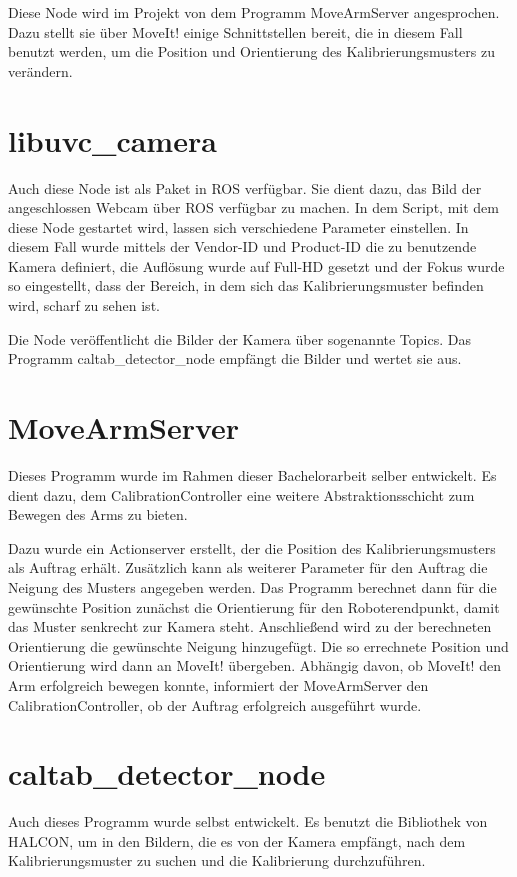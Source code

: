 Diese Node wird im Projekt von dem Programm MoveArmServer angesprochen. Dazu stellt sie über MoveIt! einige Schnittstellen bereit, die in diesem Fall benutzt werden, um die Position und Orientierung des Kalibrierungsmusters zu verändern.

\section{libuvc\_camera} %
\label{sec:libuvc_camera}
Auch diese Node ist als Paket in ROS verfügbar. Sie dient dazu, das Bild der angeschlossen Webcam über ROS verfügbar zu machen. In dem Script, mit dem diese Node gestartet wird, lassen sich verschiedene Parameter einstellen. In diesem Fall wurde mittels der Vendor-ID und Product-ID die zu benutzende Kamera definiert, die Auflösung wurde auf Full-HD gesetzt und der Fokus wurde so eingestellt, dass der Bereich, in dem sich das Kalibrierungsmuster befinden wird, scharf zu sehen ist.

Die Node veröffentlicht die Bilder der Kamera über sogenannte Topics. Das Programm caltab\_detector\_node empfängt die Bilder und wertet sie aus.

\section{MoveArmServer} %
\label{sec:movearmserver}
Dieses Programm wurde im Rahmen dieser Bachelorarbeit selber entwickelt. Es dient dazu, dem CalibrationController eine weitere Abstraktionsschicht zum Bewegen des Arms zu bieten.

Dazu wurde ein Actionserver erstellt, der die Position des Kalibrierungsmusters als Auftrag erhält. Zusätzlich kann als weiterer Parameter für den Auftrag die Neigung des Musters angegeben werden. Das Programm berechnet dann für die gewünschte Position zunächst die Orientierung für den Roboterendpunkt, damit das Muster senkrecht zur Kamera steht. Anschließend wird zu der berechneten Orientierung die gewünschte Neigung hinzugefügt. Die so errechnete Position und Orientierung wird dann an MoveIt! übergeben. Abhängig davon, ob MoveIt! den Arm erfolgreich bewegen konnte, informiert der MoveArmServer den CalibrationController, ob der Auftrag erfolgreich ausgeführt wurde.

\section{caltab\_detector\_node} %
\label{sec:caltab_detector_node}
Auch dieses Programm wurde selbst entwickelt. Es benutzt die Bibliothek von HALCON, um in den Bildern, die es von der Kamera empfängt, nach dem Kalibrierungsmuster zu suchen und die Kalibrierung durchzuführen.

